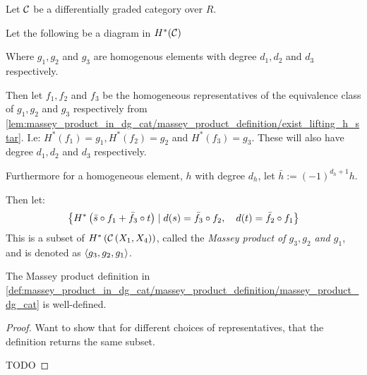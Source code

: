 \begin{definition}
    \label{def:massey_product_in_dg_cat/massey_product_definition/massey_product_dg_cat}
    Let \( {\mathcal{C}} \) be a differentially graded category over \( R \).

    Let the following be a diagram in \( H^*({\mathcal{C}}) \)
    \begin{center}
    \end{center}

    Where \( g_1, g_2 \) and \( g_3 \) are homogenous elements with degree \( d_1, d_2 \) and \( d_3 \) respectively.

    Then let \( f_1, f_2 \) and \( f_3 \) be the homogeneous representatives of the equivalence class of \( g_1, g_2 \) and \( g_3 \) respectively from \autoref{lem:massey_product_in_dg_cat/massey_product_definition/exist_lifting_h_star}. I.e: \( H^*(f_1) = g_1, H^*(f_2) = g_2 \) and \( H^*(f_3) = g_3 \). These will also have degree \( d_1, d_2 \) and \( d_3 \) respectively.

    Furthermore for a homogeneous element, \( h \) with degree \( d_h \), let \( \bar{h} := (-1)^{d_h + 1}h \).

    Then let:
    \[
        \left\{ 
            H^* \left( 
                \bar{s} \circ f_1 + \bar{f_3} \circ t
             \right)
            \mid
            d(s) = \bar{f_3} \circ f_2, \quad
            d(t) = \bar{f_2} \circ f_1
         \right\}
    \]
    This is a subset of \( H^* \left( {\mathcal{C}} \left( X_1, X_4 \right) \right) \), called the \emph{Massey product of \( g_3, g_2 \) and \( g_1 \)}, and is denoted as \( \langle g_3, g_2, g_1  \rangle \).
\end{definition}

\begin{theorem}
    The Massey product definition in \autoref{def:massey_product_in_dg_cat/massey_product_definition/massey_product_dg_cat} is well-defined.
\end{theorem}
\begin{proof}
    Want to show that for different choices of representatives, that the definition returns the same subset.

    TODO
\end{proof}

